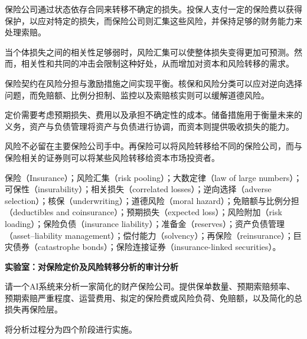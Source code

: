 

保险公司通过状态依存合同来转移不确定的损失。投保人支付一定的保险费以获得保护，以应对特定的损失，而保险公司则汇集这些风险，并保持足够的财务能力来处理索赔。

当个体损失之间的相关性足够弱时，风险汇集可以使整体损失变得更加可预测。然而，相关性和共同的冲击会限制这种好处，从而增加对资本和风险转移的需求。

保险契约在风险分担与激励措施之间实现平衡。核保和风险分类可以应对逆向选择问题，而免赔额、比例分担制、监控以及索赔核实则可以缓解道德风险。

定价需要考虑预期损失、费用以及承担不确定性的成本。储备措施用于衡量未来的义务，资产与负债管理将资产与负债进行协调，而资本则提供吸收损失的能力。

风险不必留在主要保险公司手中。再保险可以将风险转移给不同的保险公司，而与保险相关的证券则可以将某些风险转移给资本市场投资者。




保险（Insurance）；风险汇集（risk pooling）；大数定律（law of large numbers）；可保性（insurability）；相关损失（correlated losses）；逆向选择（adverse selection）；核保（underwriting）；道德风险（moral hazard）；免赔额与比例分担（deductibles and coinsurance）；预期损失（expected loss）；风险附加（risk loading）；保险负债（insurance liability）；准备金（reserves）；资产负债管理（asset--liability management）；偿付能力（solvency）；再保险（reinsurance）；巨灾债券（catastrophe bonds）；保险连接证券（insurance-linked securities）。



\textbf{实验室：对保险定价及风险转移分析的审计分析}

请一个AI系统来分析一家简化的财产保险公司。提供保单数量、预期索赔频率、预期索赔严重程度、运营费用、拟定的保险费或风险负荷、免赔额，以及简化的总损失再保险层。

将分析过程分为四个阶段进行实施。

